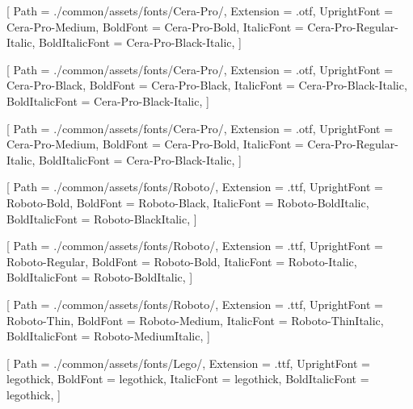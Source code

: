 
\contourlength{0.8pt}

\renewcommand{\ULdepth}{3.8pt}

\setmainfont{Cera-Pro-Medium}[
Path = ./common/assets/fonts/Cera-Pro/,
Extension = .otf,
UprightFont = Cera-Pro-Medium,
BoldFont = Cera-Pro-Bold,
ItalicFont = Cera-Pro-Regular-Italic,
BoldItalicFont = Cera-Pro-Black-Italic,
]


[
Path = ./common/assets/fonts/Cera-Pro/,
Extension = .otf,
UprightFont = Cera-Pro-Black,
BoldFont = Cera-Pro-Black,
ItalicFont = Cera-Pro-Black-Italic,
BoldItalicFont = Cera-Pro-Black-Italic,
]

[
Path = ./common/assets/fonts/Cera-Pro/,
Extension = .otf,
UprightFont = Cera-Pro-Medium,
BoldFont = Cera-Pro-Bold,
ItalicFont = Cera-Pro-Regular-Italic,
BoldItalicFont = Cera-Pro-Black-Italic,
]

[
Path = ./common/assets/fonts/Roboto/,
Extension = .ttf,
UprightFont = Roboto-Bold,
BoldFont = Roboto-Black,
ItalicFont = Roboto-BoldItalic,
BoldItalicFont = Roboto-BlackItalic,
]

[
Path = ./common/assets/fonts/Roboto/,
Extension = .ttf,
UprightFont = Roboto-Regular,
BoldFont = Roboto-Bold,
ItalicFont = Roboto-Italic,
BoldItalicFont = Roboto-BoldItalic,
]

[
Path = ./common/assets/fonts/Roboto/,
Extension = .ttf,
UprightFont = Roboto-Thin,
BoldFont = Roboto-Medium,
ItalicFont = Roboto-ThinItalic,
BoldItalicFont = Roboto-MediumItalic,
]

[
Path = ./common/assets/fonts/Lego/,
Extension = .ttf,
UprightFont = legothick,
BoldFont = legothick,
ItalicFont = legothick,
BoldItalicFont = legothick,
]